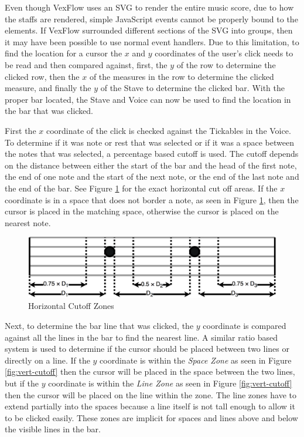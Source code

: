 \documentclass[letterpaper,12pt]{article}
\begin{document}
Even though VexFlow uses an SVG to render the entire music score, due to how the staffs are rendered, simple JavaScript
events cannot be properly bound to the elements. If VexFlow surrounded different sections of the SVG into groups, then
it may have been possible to use normal event handlers. Due to this limitation, to find the location for a cursor the
$ x $ and $ y $ coordinates of the user's click needs to be read and then compared against, first, the $ y $ of the row
to determine the clicked row, then the $ x $ of the measures in the row to determine the clicked measure, and finally
the $ y $ of the Stave to determine the clicked bar. With the proper bar located, the Stave and Voice can now be used to
find the location in the bar that was clicked.

First the $ x $ coordinate of the click is checked against the Tickables in the Voice. To determine if it was note
or rest that was selected or if it was a space between the notes that was selected, a percentage based cutoff is used.
The cutoff depends on the distance between either the start of the bar and the head of the first note, the end of one
note and the start of the next note, or the end of the last note and the end of the bar. See Figure
\ref{fig:hori-cutoff} for the exact horizontal cut off areas. If the $ x $ coordinate is in a space that does not border
a note, as seen in Figure \ref{fig:hori-cutoff}, then the cursor is placed in the matching space, otherwise the cursor
is placed on the nearest note.

\begin{figure}[H]
    \begin{center}
        \includegraphics[scale=0.2]{imgs/hori-cutoff.png}
    \end{center}
    \caption{Horizontal Cutoff Zones}
    \label{fig:hori-cutoff}
\end{figure}

Next, to determine the bar line that was clicked, the $ y $ coordinate is compared against all the lines in the bar to
find the nearest line. A similar ratio based system is used to determine if the cursor should be placed between two
lines or directly on a line. If the $ y $ coordinate is within the \textit{Space Zone} as seen in Figure
\ref{fig:vert-cutoff} then the cursor will be placed in the space between the two lines, but if the $ y $ coordinate is
within the \textit{Line Zone} as seen in Figure \ref{fig:vert-cutoff} then the cursor will be placed on the line within
the zone. The line zones have to extend partially into the spaces because a line itself is not tall enough to allow it
to be clicked easily. These zones are implicit for spaces and lines above and below the visible lines in the bar.
\end{document}
